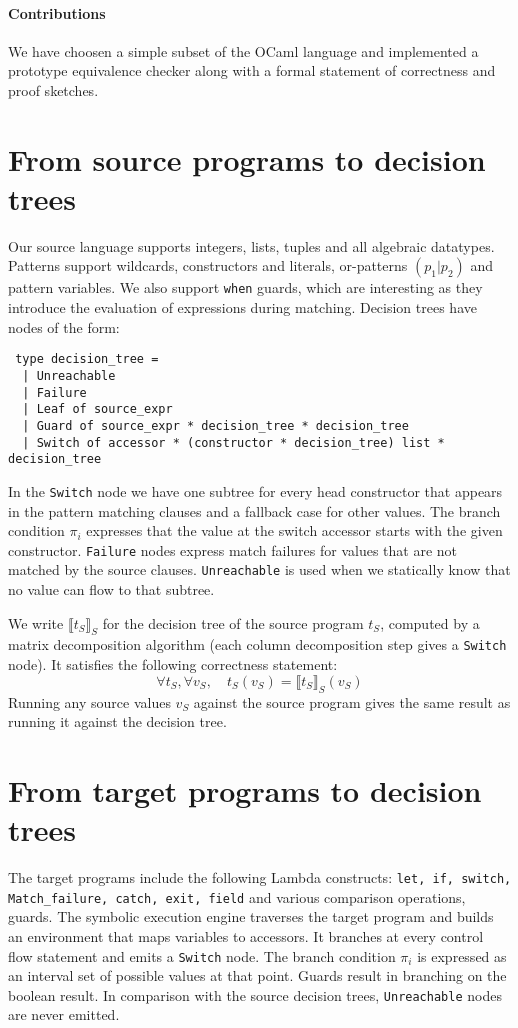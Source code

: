 \documentclass[12pt]{article}
\newcommand{\sem}[1]{{\llbracket{#1}\rrbracket}}
\begin{document}
\paragraph{Contributions} We have choosen a simple subset of the OCaml
language and implemented a prototype equivalence checker along with
a formal statement of correctness and proof sketches.

\section{From source programs to decision trees}
Our source language supports integers, lists, tuples and all algebraic
datatypes. Patterns support wildcards, constructors and literals,
or-patterns $(p_1 | p_2)$ and pattern variables.  We also support
\texttt{when} guards, which are interesting as they introduce the
evaluation of expressions during matching.  Decision trees have nodes
of the form:
\begin{lstlisting}
 type decision_tree =
  | Unreachable
  | Failure
  | Leaf of source_expr
  | Guard of source_expr * decision_tree * decision_tree
  | Switch of accessor * (constructor * decision_tree) list * decision_tree
\end{lstlisting}
In the \texttt{Switch} node we have one subtree for every head constructor
that appears in the pattern matching clauses and a fallback case for
other values. The branch condition $\pi_i$ expresses that the value at the
switch accessor starts with the given constructor.
\texttt{Failure} nodes express match failures for values that are not
matched by the source clauses.
\texttt{Unreachable} is used when we statically know that no value
can flow to that subtree.

We write $\sem{t_S}_S$ for the decision tree of the source program
$t_S$, computed by a matrix decomposition algorithm (each column
decomposition step gives a \texttt{Switch} node).
It satisfies the following correctness statement:
\[
\forall t_S, \forall v_S, \quad t_S(v_S) = \sem{t_S}_S(v_S)
\]
Running any source values $v_S$ against the source program gives the
same result as running it against the decision tree.


\section{From target programs to decision trees}
The target programs include the following Lambda constructs:
\texttt{let, if, switch, Match\_failure, catch, exit, field} and
various comparison operations, guards. The symbolic execution engine
traverses the target program and builds an environment that maps
variables to accessors. It branches at every control flow statement
and emits a \texttt{Switch} node. The branch condition $\pi_i$ is expressed as
an interval set of possible values at that point.
%
Guards result in branching on the boolean result.
%
In comparison with the source decision trees, \texttt{Unreachable}
nodes are never emitted.
\end{document}

